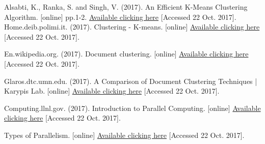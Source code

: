 \documentclass[fleqn,10pt]{SelfArx} %
\begin{document}
\begin{thebibliography}{9}

Alsabti, K., Ranka, S. and Singh, V. (2017). An Efficient K-Means Clustering Algorithm. [online] pp.1-2. \href{https://www.cs.utexas.edu/~kuipers/readings/Alsabti-hpdm-98.pdf}{Available clicking here} [Accessed 22 Oct. 2017].
Home.deib.polimi.it. (2017). Clustering - K-means. [online] \href{http://home.deib.polimi.it/matteucc/Clustering/tutorial_html/kmeans.html}{Available clicking here} [Accessed 22 Oct. 2017].
 
En.wikipedia.org. (2017). Document clustering. [online] \href{https://en.wikipedia.org/wiki/Document_clustering}{Available clicking here} [Accessed 22 Oct. 2017].

Glaros.dtc.umn.edu. (2017). A Comparison of Document Clustering Techniques | Karypis Lab. [online] \href{http://glaros.dtc.umn.edu/gkhome/node/157}{Available clicking here} [Accessed 22 Oct. 2017].




Computing.llnl.gov. (2017). Introduction to Parallel Computing. [online] \href{https://computing.llnl.gov/tutorials/parallel_comp/}{Available clicking here}  [Accessed 22 Oct. 2017].


Types of Parallelism. [online] \href{http://www.inf.ed.ac.uk/teaching/courses/pa/Notes/lecture02-types.pdf}{Available clicking here} [Accessed 22 Oct. 2017].

\end{thebibliography}




\end{document}
